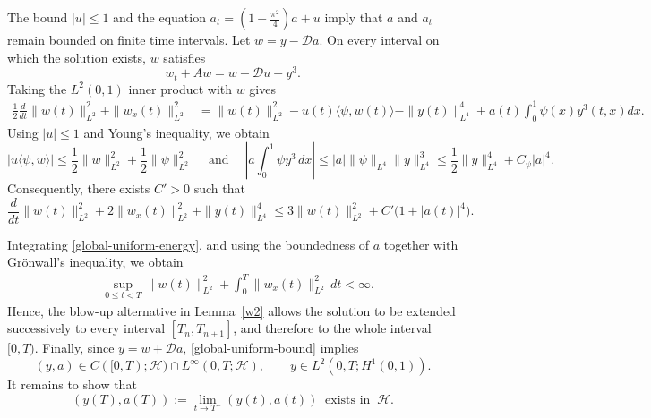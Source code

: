 \documentclass[a4paper]{article}
\numberwithin{equation}{section}
\begin{document}
\begin{appendices}
The bound $|u|\le1$ and the equation $a_t=(1-\frac{\pi^2}{4})a+u$ imply that $a$ and $a_t$ remain bounded on finite time intervals. Let $w=y-\mathcal D a$. On every interval on which the solution exists, $w$ satisfies
$$ w_t+Aw=w-\mathcal Du-y^3.$$
Taking the $L^2(0,1)$ inner product with $w$ gives
\begin{equation}\label{global-L2-energy222} 
\begin{aligned} 
\frac12\frac{d}{dt}\|w(t)\|_{L^2}^2 +\|w_x(t)\|_{L^2}^2 &= \|w(t)\|_{L^2}^2 -u(t)\langle\psi,w(t)\rangle -\|y(t)\|_{L^4}^4 +a(t)\int_0^1\psi(x)y^3(t,x)dx . 
\end{aligned} 
\end{equation}
Using $|u|\le 1$ and Young's inequality, we obtain
$$|u\langle\psi,w\rangle| \le \frac12\|w\|_{L^2}^2 +\frac12\|\psi\|_{L^2}^2\quad\; \text{and}\quad\; \left| a\int_0^1\psi y^3\,dx \right| \le |a|\|\psi\|_{L^4}\|y\|_{L^4}^3 \le \frac12\|y\|_{L^4}^4 +C_\psi |a|^4.$$
Consequently, there exists $C'>0$ such that
\begin{equation}\label{global-uniform-energy} 
\frac{d}{dt}\|w(t)\|_{L^2}^2 +2\|w_x(t)\|_{L^2}^2 +\|y(t)\|_{L^4}^4 \le 3\|w(t)\|_{L^2}^2 +C'\bigl(1+|a(t)|^4\bigr). 
\end{equation}

Integrating \eqref{global-uniform-energy}, and using the boundedness of $a$ together with Gr\"onwall's inequality, we obtain 
\begin{equation}\label{global-uniform-bound} 
\begin{aligned} &\sup_{0\le t<T}\|w(t)\|_{L^2}^2 +\int_0^T\|w_x(t)\|_{L^2}^2\,dt <\infty.\end{aligned} 
\end{equation} 
Hence, the blow-up alternative in Lemma~\ref{w2} allows the solution to be extended successively to every interval $[T_n,T_{n+1}]$, and therefore to the whole interval $[0,T)$. Finally, since $y=w+\mathcal D a$, \eqref{global-uniform-bound} implies
\begin{equation}\label{ya-regular} 
(y,a)\in C([0,T);\mathcal H) \cap L^\infty(0,T;\mathcal H), \qquad y\in L^2(0,T;H^1(0,1)). 
\end{equation} 
It remains to show that 
\begin{equation}\label{we-po-U}
(y(T),a(T)):=\lim_{t\to T^{-}}(y(t),a(t)) \;\;\text{exists in}\;\;\mathcal{H}.
\end{equation}


\end{appendices}
\end{document}
